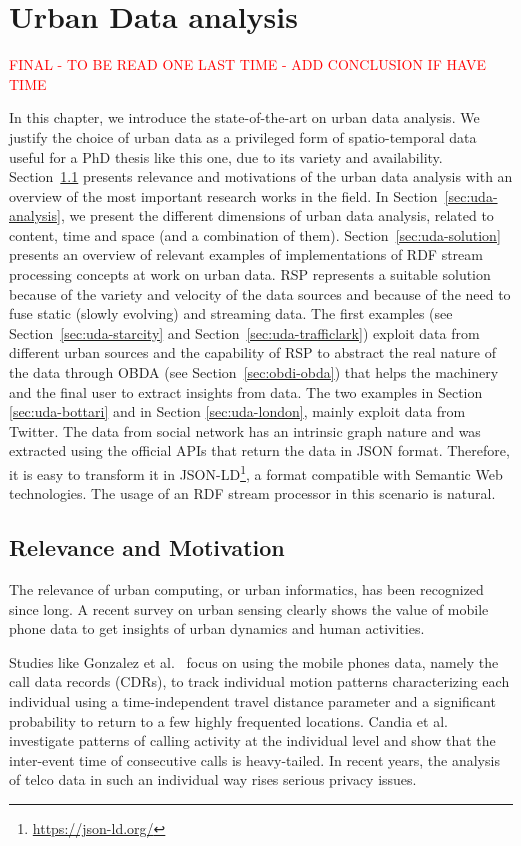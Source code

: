 \chapter{Urban Data analysis}\label{ch:uda}

\textcolor{red}{FINAL - TO BE READ ONE LAST TIME - ADD CONCLUSION IF HAVE TIME}

In this chapter, we introduce the state-of-the-art on urban data analysis.
We justify the choice of urban data as a privileged form of spatio-temporal data useful for a PhD thesis like this one, due to its variety and availability.
Section~\ref{sec:uda-motivation} presents relevance and motivations of the urban data analysis with an overview of the most important research works in the field.
In Section~\ref{sec:uda-analysis}, we present the different dimensions of urban data analysis, related to content, time and space (and a combination of them).
Section~\ref{sec:uda-solution} presents an overview of relevant examples of implementations of RDF stream processing concepts at work on urban data.
RSP represents a suitable solution because of the variety and velocity of the data sources and because of the need to fuse static (slowly evolving) and streaming data.
The first examples (see Section~\ref{sec:uda-starcity} and Section~\ref{sec:uda-trafficlark}) exploit data from different urban sources and the capability of RSP to abstract the real nature of the data through OBDA (see Section~\ref{sec:obdi-obda}) that helps the machinery and the final user to extract insights from data.
The two examples in Section \ref{sec:uda-bottari} and in Section \ref{sec:uda-london}, mainly exploit data from Twitter. The data from social network has an intrinsic graph nature and was extracted using the official APIs that return the data in JSON format. Therefore, it is easy to transform it in JSON-LD\footnote{\url{https://json-ld.org/}}, a format compatible with Semantic Web technologies. The usage of an RDF stream processor in this scenario is natural.

\section{Relevance and Motivation}\label{sec:uda-motivation}
The relevance of urban computing, or urban informatics, has been recognized since long. A recent survey on urban sensing \cite{DBLP:journals/csur/CalabreseFB14} clearly shows the value of mobile phone data to get insights of urban dynamics and human activities. 

Studies like Gonzalez et al.~\cite{gonzalez2008understanding} focus on using the mobile phones data, namely the call data records (CDRs), to track individual motion patterns characterizing each individual using a time-independent travel distance parameter and a significant probability to return to a few highly frequented locations. Candia et al.~\cite{candia2008uncovering} investigate patterns of calling activity at the individual level and show that the inter-event time of consecutive calls is heavy-tailed. 
In recent years, the analysis of telco data in such an individual way rises serious privacy issues.

